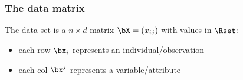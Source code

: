 \begin{frame}[fragile]
  \frametitle{The data matrix}

  The data set is a $n\times d$ matrix  $\bX = (x_{ij})$ with values in $\Rset$:
  \begin{itemize}
    \item each row $\bx_i$ represents an individual/observation
    \item each col $\bx^j$ represents a variable/attribute
  \end{itemize}

\begin{knitrout}
\color{fgcolor}
\end{knitrout}

\end{frame}

